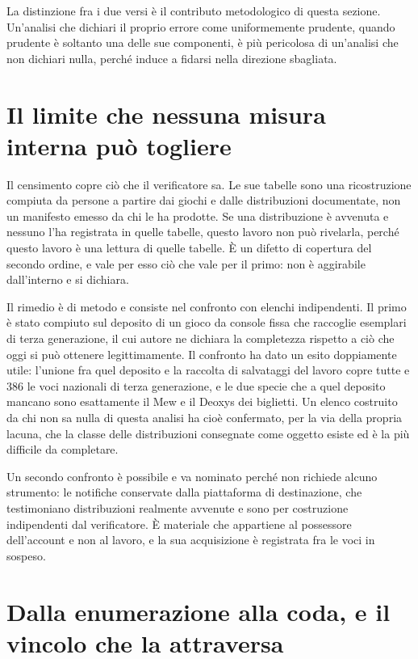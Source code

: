La distinzione fra i due versi è il contributo metodologico di questa sezione. Un'analisi che dichiari il proprio errore come uniformemente prudente, quando prudente è soltanto una delle sue componenti, è più pericolosa di un'analisi che non dichiari nulla, perché induce a fidarsi nella direzione sbagliata.

\section{Il limite che nessuna misura interna può togliere}

Il censimento copre ciò che il verificatore sa. Le sue tabelle sono una ricostruzione compiuta da persone a partire dai giochi e dalle distribuzioni documentate, non un manifesto emesso da chi le ha prodotte. Se una distribuzione è avvenuta e nessuno l'ha registrata in quelle tabelle, questo lavoro non può rivelarla, perché questo lavoro è una lettura di quelle tabelle. È un difetto di copertura del secondo ordine, e vale per esso ciò che vale per il primo: non è aggirabile dall'interno e si dichiara.

Il rimedio è di metodo e consiste nel confronto con elenchi indipendenti. Il primo è stato compiuto sul deposito di un gioco da console fissa che raccoglie esemplari di terza generazione, il cui autore ne dichiara la completezza rispetto a ciò che oggi si può ottenere legittimamente. Il confronto ha dato un esito doppiamente utile: l'unione fra quel deposito e la raccolta di salvataggi del lavoro copre tutte e 386 le voci nazionali di terza generazione, e le due specie che a quel deposito mancano sono esattamente il Mew e il Deoxys dei biglietti. Un elenco costruito da chi non sa nulla di questa analisi ha cioè confermato, per la via della propria lacuna, che la classe delle distribuzioni consegnate come oggetto esiste ed è la più difficile da completare.

Un secondo confronto è possibile e va nominato perché non richiede alcuno strumento: le notifiche conservate dalla piattaforma di destinazione, che testimoniano distribuzioni realmente avvenute e sono per costruzione indipendenti dal verificatore. È materiale che appartiene al possessore dell'account e non al lavoro, e la sua acquisizione è registrata fra le voci in sospeso.

\section{Dalla enumerazione alla coda, e il vincolo che la attraversa}
\label{sec:coda}

